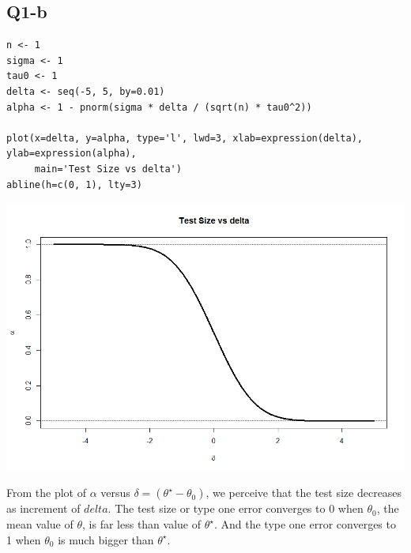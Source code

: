 \documentclass[11pt,letterpaper]{article}
\begin{document}
\subsection*{Q1-b}
\begin{verbatim}
n <- 1
sigma <- 1
tau0 <- 1
delta <- seq(-5, 5, by=0.01)
alpha <- 1 - pnorm(sigma * delta / (sqrt(n) * tau0^2))

plot(x=delta, y=alpha, type='l', lwd=3, xlab=expression(delta), ylab=expression(alpha),
     main='Test Size vs delta')
abline(h=c(0, 1), lty=3)
\end{verbatim}

\includegraphics[width=150mm]{q1-b.png}

\noindent From the plot of $\alpha$ versus $\delta = (\theta^{\star} - \theta_0)$, we perceive that the test size decreases as increment of $delta$. The test size or type one error converges to 0 when $\theta_0$, the mean value of $\theta$, is far less than value of $\theta^{\star}$. And the type one error converges to 1 when $\theta_0$ is much bigger than $\theta^{\star}$.
\end{document}
